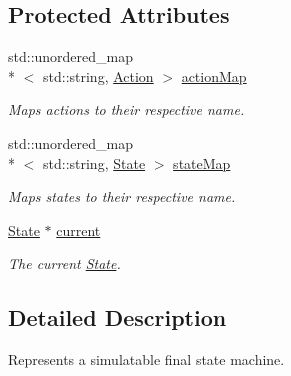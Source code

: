 \subsection*{Protected Attributes}
\begin{DoxyCompactItemize}
\item 
\hypertarget{classfsml_1_1Machine_a02a00a80f4f77625cd1fbcb2314d3c21}{std\-::unordered\-\_\-map\\*
$<$ std\-::string, \hyperlink{classfsml_1_1Action}{Action} $>$ \hyperlink{classfsml_1_1Machine_a02a00a80f4f77625cd1fbcb2314d3c21}{action\-Map}}\label{classfsml_1_1Machine_a02a00a80f4f77625cd1fbcb2314d3c21}

\begin{DoxyCompactList}\small\item\em Maps actions to their respective name. \end{DoxyCompactList}\item 
\hypertarget{classfsml_1_1Machine_a8d777492e8e8b0e79b041444f386c319}{std\-::unordered\-\_\-map\\*
$<$ std\-::string, \hyperlink{classfsml_1_1State}{State} $>$ \hyperlink{classfsml_1_1Machine_a8d777492e8e8b0e79b041444f386c319}{state\-Map}}\label{classfsml_1_1Machine_a8d777492e8e8b0e79b041444f386c319}

\begin{DoxyCompactList}\small\item\em Maps states to their respective name. \end{DoxyCompactList}\item 
\hypertarget{classfsml_1_1Machine_a8c4e7bc3c75c8b40a28d0b33a457be9d}{\hyperlink{classfsml_1_1State}{State} $\ast$ \hyperlink{classfsml_1_1Machine_a8c4e7bc3c75c8b40a28d0b33a457be9d}{current}}\label{classfsml_1_1Machine_a8c4e7bc3c75c8b40a28d0b33a457be9d}

\begin{DoxyCompactList}\small\item\em The current \hyperlink{classfsml_1_1State}{State}. \end{DoxyCompactList}\end{DoxyCompactItemize}


\subsection{Detailed Description}
Represents a simulatable final state machine. 



